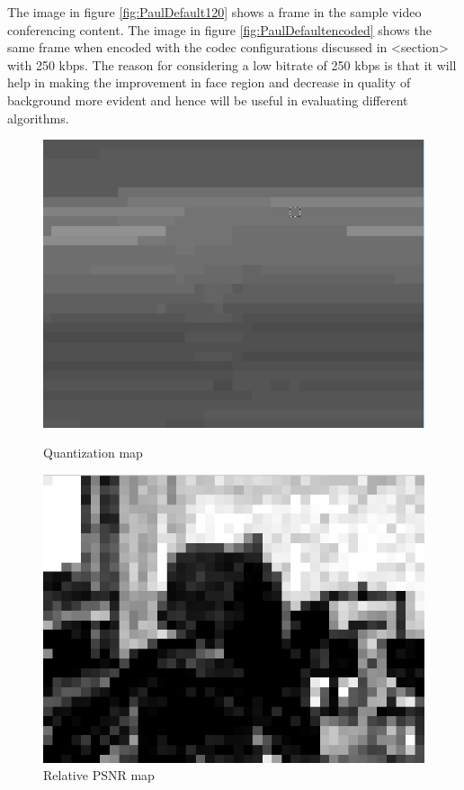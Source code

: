 \documentclass[11pt]{article} %
\begin{document}
The image in figure \ref{fig:PaulDefault120} shows a frame in the sample video conferencing content. The image in figure \ref{fig:PaulDefaultencoded} shows the same frame when encoded with the codec configurations discussed in <section> with 250 kbps. The reason for considering a low bitrate of 250 kbps is that it will help in making the improvement in face region and decrease in quality of background more evident and hence will be useful in evaluating different algorithms. 

\begin{figure}[!h]
    \centering
    \includegraphics[scale=0.5]{PaulDefault120_91250kbps_quant}
    \caption{Quantization map}
    \label{fig:PaulDefault120Quant}
    \includegraphics[scale=0.5]{PaulDefault120_91250kbps_psnr}
    \caption{Relative PSNR map}
    \label{fig:PaulDefault120PSNR}
\end{figure} 
\end{document}
